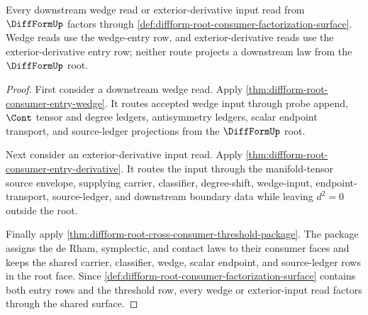 \begin{theorem}
\label{thm:diffform-root-consumer-factorization-wedge-derivative}
Every downstream wedge read or exterior-derivative input read from
$\DiffFormUp$ factors through
\autoref{def:diffform-root-consumer-factorization-surface}. Wedge reads use
the wedge-entry row, and exterior-derivative reads use the
exterior-derivative entry row; neither route projects a downstream law from
the $\DiffFormUp$ root.
\end{theorem}
\begin{proof}
First consider a downstream wedge read. Apply
\autoref{thm:diffform-root-consumer-entry-wedge}. It routes accepted wedge
input through probe append, $\Cont$ tensor and degree ledgers,
antisymmetry ledgers, scalar endpoint transport, and source-ledger
projections from the $\DiffFormUp$ root.

Next consider an exterior-derivative input read. Apply
\autoref{thm:diffform-root-consumer-entry-derivative}. It routes the input
through the manifold-tensor source envelope, supplying carrier, classifier,
degree-shift, wedge-input, endpoint-transport, source-ledger, and downstream
boundary data while leaving $d^2=0$ outside the root.

Finally apply
\autoref{thm:diffform-root-cross-consumer-threshold-package}. The package
assigns the de Rham, symplectic, and contact laws to their consumer faces and
keeps the shared carrier, classifier, wedge, scalar endpoint, and
source-ledger rows in the root face. Since
\autoref{def:diffform-root-consumer-factorization-surface} contains both
entry rows and the threshold row, every wedge or exterior-input read factors
through the shared surface.
\end{proof}

